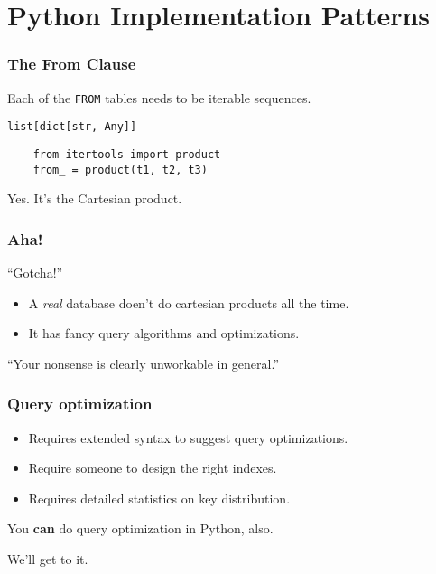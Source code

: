 \documentclass{beamer}
\begin{document}
\section{Python Implementation Patterns}

\begin{frame}[fragile]
    \frametitle{The From Clause}

    Each of the \texttt{FROM} tables needs to be iterable sequences.

    \texttt{list[dict[str, Any]]}

    \vspace{1em}
    \begin{verbatim}
    from itertools import product
    from_ = product(t1, t2, t3)
    \end{verbatim}

    \vspace{1em}
    Yes. It's the Cartesian product.

\end{frame}

\begin{frame}[fragile]
    \frametitle{Aha!}

    \begin{alertblock}{``Gotcha!''}
    \begin{itemize}
        \item A \textit{real} database doen't do cartesian products all the time.

        \item It has fancy query algorithms and optimizations. \pause
    \end{itemize}
    \vspace{1em}

    ``Your nonsense is clearly unworkable in general.''
    \end{alertblock}

\end{frame}

\begin{frame}[fragile]
    \frametitle{Query optimization}

    \begin{itemize}
    \item Requires extended syntax to suggest query optimizations.

    \item Require someone to design the right indexes.

    \item Requires detailed statistics on key distribution.
    \end{itemize}

    \vspace{1em}

    You \textbf{can} do query optimization in Python, also.\pause
    \vspace{1em}

    We'll get to it.
\end{frame}
\end{document}
